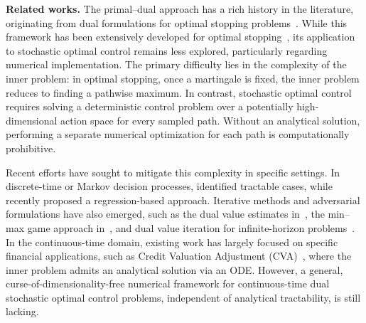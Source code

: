 \documentclass[11pt]{article}
\numberwithin{equation}{section}
\theoremstyle{plain}
\theoremstyle{definition}
\theoremstyle{remark}
\begin{document}
\vskip 2pt
\noindent\textbf{Related works.} The primal--dual approach has a rich history in the literature, originating from dual formulations for optimal stopping problems~\cite{rogers2002monte, haugh2004pricing}. While this framework has been extensively developed for optimal stopping~\cite{belomestny2009true, desai2012pathwise, belomestny2019optimal, yang2024deep, bayer2025primal, ye2025deepmartingale}, its application to stochastic optimal control remains less explored, particularly regarding numerical implementation. The primary difficulty lies in the complexity of the inner problem: in optimal stopping, once a martingale is fixed, the inner problem reduces to finding a pathwise maximum. In contrast, stochastic optimal control requires solving a deterministic control problem over a potentially high-dimensional action space for every sampled path. Without an analytical solution, performing a separate numerical optimization for each path is computationally prohibitive.

Recent efforts have sought to mitigate this complexity in specific settings. In discrete-time or Markov decision processes, \cite{desai2012bounds} identified tractable cases, while \cite{belomestny2024primal} recently proposed a regression-based approach. Iterative methods and adversarial formulations have also emerged, such as the dual value estimates in~\cite{chen2024information}, the min--max game approach in~\cite{chen2025adversarial}, and dual value iteration for infinite-horizon problems~\cite{belomestny2026uvip}. In the continuous-time domain, existing work has largely focused on specific financial applications, such as Credit Valuation Adjustment (CVA)~\cite{henry2016dual, henry2017deep}, where the inner problem admits an analytical solution via an ODE. However, a general, curse-of-dimensionality-free numerical framework for continuous-time dual stochastic optimal control problems, independent of analytical tractability, is still lacking.
\end{document}
